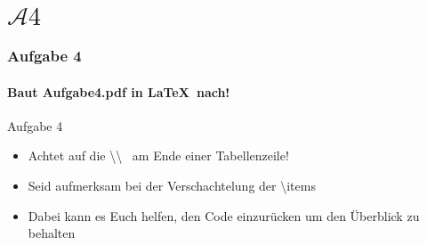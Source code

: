\section{$\mathcal{A}4$} 
\begin{frame}
\frametitle{Aufgabe 4}
\framesubtitle{Baut Aufgabe4.pdf in \LaTeX ~nach!} 

\begin{block}{Aufgabe 4}
\begin{itemize}
  \item Achtet auf die \color{nounibaredII}\textbackslash \textbackslash  \color{black}~ am Ende einer Tabellenzeile!%
  \item Seid aufmerksam bei der Verschachtelung der \color{nounibaredII}\textbackslash item\color{black}s%
  \item Dabei kann es Euch helfen, den Code einzur\"ucken um den \"Uberblick zu behalten%
\end{itemize}
\end{block}
\end{frame}